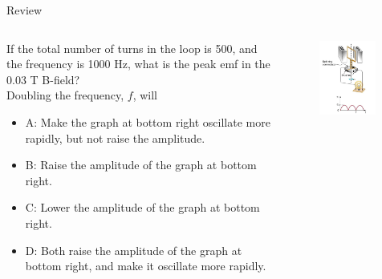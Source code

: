 \documentclass{beamer}
\begin{document}
\begin{frame}{Review}
\begin{columns}[T]
\begin{column}{0.65\textwidth}
\small
If the total number of turns in the loop is 500, and the frequency is 1000 Hz, what is the peak emf in the 0.03 T B-field? \\ \vspace{0.5cm}
Doubling the frequency, $f$, will
\begin{itemize}
\item A: Make the graph at bottom right oscillate more rapidly, but not raise the amplitude.
\item B: Raise the amplitude of the graph at bottom right.
\item C: Lower the amplitude of the graph at bottom right.
\item D: Both raise the amplitude of the graph at bottom right, and make it oscillate more rapidly.
\end{itemize}
\end{column}
\begin{column}{0.35\textwidth}
\begin{figure}
\centering
\includegraphics[width=0.95\textwidth]{ex6.png}
\caption{\label{fig:ex6}}
\end{figure}
\end{column}
\end{columns}
\end{frame}
\end{document}

